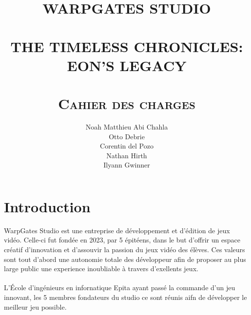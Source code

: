 \documentclass{article}
\begin{document}
\title{ \HUGE \textbf{ \textsc{\uppercase{WarpGates Studio}}}
		\\ [2.0cm]
		\Xhline{2pt} \\
        [0.5cm]
		\LARGE \uppercase{The Timeless Chronicles: \\ Eon's Legacy}\\
        [0.5cm]
		\Xhline{2pt} \\ 
        [4cm]
		\textsc{Cahier des charges}}
  
\author{
		Noah Matthieu Abi Chahla\\
        Otto Debrie\\
        Corentin del Pozo\\
        Nathan Hirth\\
        Ilyann Gwinner
}
\date{}
\maketitle
\newpage
\large
\pagestyle{fancy}
\cfoot{\thepage}
\tableofcontents
\pagebreak

\lhead{}

\renewcommand{\headrulewidth}{1pt}
\renewcommand{\footrulewidth}{1pt}

\section{Introduction}
\paragraph{}
WarpGates Studio est une entreprise de d\'eveloppement et d'\'edition de jeux vid\'eo. Celle-ci fut fond\'ee en 2023, par 5 \'epitéens, dans le but d'offrir un espace cr\'eatif d'innovation et d'assouvir la passion du jeux vid\'eo des \'el\`eves. Ces valeurs sont tout d'abord une autonomie totale des d\'eveloppeur afin de proposer au plus large public une experience inoubliable \`a travers d'exellents jeux.

\paragraph{}
L'\'Ecole d'ingénieurs en infornatique Epita ayant pass\'e la commande d'un jeu innovant, les 5 membres fondateurs du studio ce sont r\'eunis aifn de d\'evelopper le meilleur jeu possible.
\end{document}
